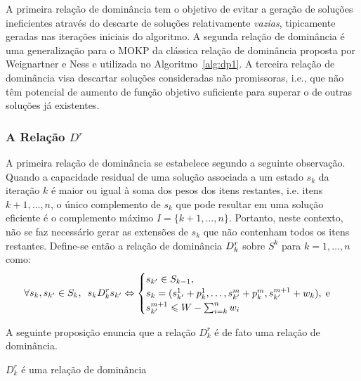 A primeira relação de dominância tem o objetivo de evitar a geração de soluções ineficientes
através do descarte de soluções relativamente \emph{vazias}, tipicamente geradas nas iterações iniciais do algoritmo.
A segunda relação de dominância é uma generalização para o MOKP da clássica relação de dominância
proposta por Weignartner e Ness e utilizada no Algoritmo~\ref{alg:dp1}.
A terceira relação de dominância visa descartar soluções consideradas não promissoras, i.e.,
que não têm potencial de aumento de função objetivo suficiente para superar o de outras soluções já
existentes.

\subsubsection{A Relação $D^r$}

A primeira relação de dominância se estabelece segundo a seguinte observação.
Quando a capacidade residual de uma solução associada a um estado $s_k$
da iteração $k$ é maior ou igual à soma dos pesos dos itens restantes,
i.e. itens $k+1, \ldots, n$, o único complemento de $s_k$ que pode resultar
em uma solução eficiente é o complemento máximo $I = \{k+1, \ldots, n\}$.
Portanto, neste contexto, não se faz necessário gerar as extensões de $s_k$
que não contenham todos os itens restantes.
Define-se então a relação de dominância $D_k^r$ sobre $S^k$ para
$k = 1, \ldots, n$ como:
\begin{displaymath}
  \forall s_k, s_{{k'}} \in S_k, \enskip
  s_k D_k^r s_{{k'}}
    \Leftrightarrow
    \begin{cases}
      s_{{k'}} \in S_{k-1}, \\
      s_k = (s_{{k'}}^1 + p_k^1, \ldots, s_{{k'}}^m + p_k^m, s_{{k'}}^{m+1} + w_k), \; \text{e} \\
      s_{{k'}}^{m+1} \leqslant W - \sum_{i=k}^n w_i
    \end{cases}
\end{displaymath}

A seguinte proposição enuncia que a relação $D_k^r$ é de fato uma relação de dominância.

\begin{myprop}[Relação $D_k^r$]
  \noindent
  $D_k^r$ é uma relação de dominância
\end{myprop}

